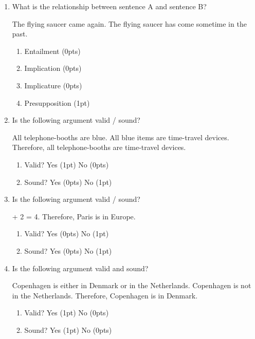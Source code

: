 \documentclass[a4]{article}
\begin{document}
\begin{enumerate}
 \item What is the relationship between sentence A and sentence B?

\begin{exe}
\ex
\begin{xlist}
\ex  The flying saucer came again.
\ex The flying saucer has come sometime in the past.
\end{xlist}
\end{exe}
   \begin{enumerate}[noitemsep]
        \item Entailment (0pts)
        \item Implication (0pts)
         \item Implicature (0pts)
           \item Presupposition (1pt)
    \end{enumerate}
    
\item Is the following argument valid / sound?
\begin{exe}
\ex
\begin{xlist}
\ex All telephone-booths are blue.
\ex All blue items are time-travel devices.
\ex Therefore, all telephone-booths are time-travel devices.
\end{xlist}
\end{exe}
 \begin{enumerate}[noitemsep]
    \item Valid? Yes (1pt) No (0pts)
    \item Sound? Yes (0pts) No (1pt)
\end{enumerate}

\item Is the following argument valid / sound?

\begin{exe}
\ex
\begin{xlist}
 + 2 = 4.
\ex Therefore, Paris is in Europe.
\end{xlist}
\end{exe}
 \begin{enumerate}[noitemsep]
    \item Valid? Yes (0pts) No (1pt)
    \item Sound? Yes (0pts) No (1pt)
\end{enumerate}

\item Is the following argument valid and sound?
\begin{exe}
\ex
\begin{xlist}
\ex Copenhagen is either in Denmark or in the Netherlands.
\ex Copenhagen is not in the Netherlands.
\ex Therefore, Copenhagen is in Denmark.
\end{xlist}
\end{exe}
 \begin{enumerate}[noitemsep]
    \item Valid? Yes (1pt) No (0pts)
    \item Sound? Yes (1pt) No (0pts)
\end{enumerate}


\end{enumerate}
\end{document}
